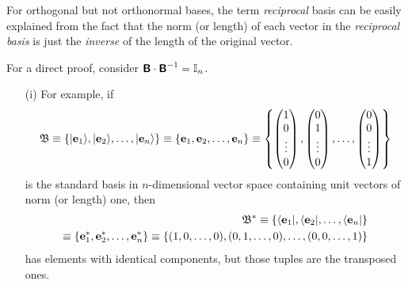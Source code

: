 For orthogonal but not orthonormal bases, the term {\em reciprocal} basis
can be easily explained from the fact that the norm (or length) of each vector in the {\em reciprocal basis}
is just the {\em inverse} of the length of the original vector.

{\color{OliveGreen}
\bproof
For a direct proof, consider $\textsf{\textbf{B}}\cdot \textsf{\textbf{B}}^{-1} ={\Bbb I}_n$.
\eproof
}


{\color{blue}
\bexample
\begin{itemize}
\item[(i)]
For example,
if
\begin{equation}
{\frak B}
\equiv
\{ \vert {\bf e}_1 \rangle ,\vert  {\bf e}_2\rangle ,\ldots ,\vert {\bf e}_n\rangle  \}
\equiv
\{{\bf e}_1, {\bf e}_2,\ldots ,{\bf e}_n\}
\equiv
\left\{
\begin{pmatrix}
1\\
0\\
\vdots \\
0
\end{pmatrix}
,
\begin{pmatrix}
0\\
1\\
\vdots \\
0
\end{pmatrix}
,
\ldots ,
\begin{pmatrix}
0\\
0\\
\vdots \\
1
\end{pmatrix}
\right\}
\end{equation}
is the standard basis in $n$-dimensional vector space containing unit vectors of norm (or length) one,
then
\begin{equation}
\begin{split}
{\frak B}^*
\equiv
\{ \langle {\bf e}_1 \vert , \langle {\bf e}_2 \vert , \ldots ,\langle {\bf e}_n \vert \}
\\
\equiv
\{{\bf e}_1^* ,{\bf e}_2^*, \ldots ,{\bf e}_n^* \}
\equiv
\left\{
(1,0,\ldots,0),
(0,1,\ldots,0),
\ldots,
(0,0,\ldots,1)
\right\}
\end{split}
\end{equation}
has elements with identical components,
but those tuples are the transposed ones.


\end{itemize}}
